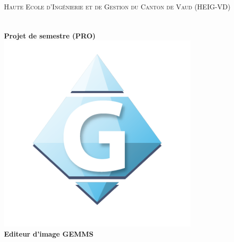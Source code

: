 \begin{titlepage}
    \begin{center}
        
        \textsc{\LARGE Haute Ecole d'Ingénierie et de Gestion du Canton de Vaud (HEIG-VD)}\\[1.5cm]
        
        \textsc{\Large }\\[0.5cm]
        
        \HRule \\[0.4cm]
        
        {\huge \bfseries Projet de semestre (PRO)\\
            \includegraphics[width=10cm]{img/gemms_logo.png}\\
            Editeur d'image GEMMS \\[0.4cm] }
        
        \HRule \\[1.5cm]
        

\end{center}
\end{titlepage}
